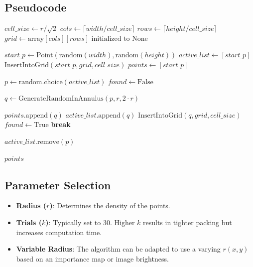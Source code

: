 \subsection{Pseudocode}
\begin{algorithm}
\caption{Poisson Disk Sampling}\label{alg:poisson_disk_sampling}
\begin{algorithmic}
    \State $cell\_size \gets r / \sqrt{2}$
    \State $cols \gets \lceil width / cell\_size \rceil$
    \State $rows \gets \lceil height / cell\_size \rceil$
    \State $grid \gets \text{array}[cols][rows] \text{ initialized to None}$

    \State $start\_p \gets \text{Point}(\text{random}(width), \text{random}(height))$
    \State $active\_list \gets [start\_p]$
    \State $\text{InsertIntoGrid}(start\_p, grid, cell\_size)$
    \State $points \gets [start\_p]$

        \State $p \gets \text{random.choice}(active\_list)$
        \State $found \gets \text{False}$

            \State $q \gets \text{GenerateRandomInAnnulus}(p, r, 2 \cdot r)$

                \State $points.\text{append}(q)$
                \State $active\_list.\text{append}(q)$
                \State $\text{InsertIntoGrid}(q, grid, cell\_size)$
                \State $found \gets \text{True}$
                \State \textbf{break}
            \EndIf
        \EndFor

            \State $active\_list.\text{remove}(p)$
        \EndIf
    \EndWhile

    \Return $points$
\EndFunction
\end{algorithmic}
\end{algorithm}

\subsection{Parameter Selection}
\begin{itemize}
    \item \textbf{Radius ($r$)}: Determines the density of the points.
    \item \textbf{Trials ($k$)}: Typically set to 30. Higher $k$ results in tighter packing but increases computation time.
    \item \textbf{Variable Radius}: The algorithm can be adapted to use a varying $r(x, y)$ based on an importance map or image brightness.
\end{itemize}

